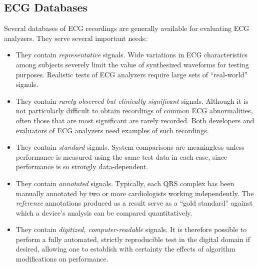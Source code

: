 \documentclass[twoside]{article}
\begin{document}
\subsection{ECG Databases}
Several databases of ECG recordings are generally available
for evaluating ECG analyzers.  They serve several important needs:
\begin{itemize}
   \item  They contain {\em representative} signals.  Wide variations in
ECG characteristics among subjects severely limit the value of
synthesized waveforms for testing purposes.  Realistic tests of ECG
analyzers require large sets of ``real-world'' signals.

   \item They contain {\em rarely observed but clinically significant}
signals.  Although it is not particularly difficult to obtain
recordings of common ECG abnormalities, often those that are most
significant are rarely recorded.  Both developers and evaluators of
ECG analyzers need examples of such recordings.

   \item  They contain {\em standard} signals.  System comparisons
are meaningless unless performance is measured using the same test
data in each case, since performance is so strongly data-dependent.

   \item  They contain {\em annotated} signals.  Typically, each QRS
complex has been manually annotated by two or more cardiologists
working independently.  The {\em reference} annotations produced
as a result serve as a ``gold standard'' against which a device's
analysis can be compared quantitatively.

   \item They contain {\em digitized, computer-readable} signals.  It is
therefore possible to perform a fully automated, strictly reproducible
test in the digital domain if desired, allowing one to establish with
certainty the effects of algorithm modifications on performance.
\end{itemize}
\end{document}

